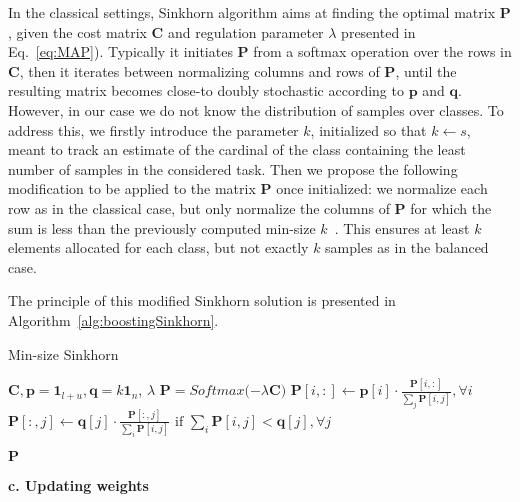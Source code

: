 \documentclass[review]{elsarticle}
\begin{document}
In the classical settings, Sinkhorn algorithm aims at finding the optimal matrix $\mathbf{P}$, given the cost matrix $\mathbf{C}$ and regulation parameter $\lambda$ presented in Eq.~\ref{eq:MAP}). Typically it initiates $\mathbf{P}$ from a softmax operation over the rows in $\mathbf{C}$, then it iterates between normalizing columns and rows of $\mathbf{P}$, until the resulting matrix becomes close-to doubly stochastic according to $\mathbf{p}$ and $\mathbf{q}$. However, in our case we do not know the distribution of samples over classes. To address this, we firstly introduce the parameter $k$, initialized so that $k\leftarrow s$, meant to track an estimate of the cardinal of the class containing the least number of samples in the considered task. Then we propose the following modification to be applied to the matrix $\mathbf{P}$ once initialized: we normalize each row as in the classical case, but only normalize the columns of $\mathbf{P}$ for which the sum is less than the previously computed min-size $k$~\cite{lichtenstein2020tafssl}. This ensures at least $k$ elements allocated for each class, but not exactly $k$ samples as in the balanced case. 

The principle of this modified Sinkhorn solution is presented in Algorithm~\ref{alg:boostingSinkhorn}.

\begin{algorithm}[tb]
   \caption{Min-size Sinkhorn}
   \label{alg:boostingSinkhorn}
\begin{algorithmic}
    {$\mathbf{C}, \mathbf{p}= \mathbf{1}_{l+u}, \mathbf{q}=k\mathbf{1}_{n}$, $\lambda$}
    {$\mathbf{P}= Softmax{(-\lambda\mathbf{C}})$}
   \STATE $\mathbf{P}[i,:] \leftarrow \mathbf{p}[i]\cdot\frac{\mathbf{P}[i,:]}{\sum_j{\mathbf{P}[i,j]}}, \forall i$
   \STATE $\mathbf{P}[:,j] \leftarrow \mathbf{q}[j]\cdot\frac{\mathbf{P}[:,j]}{\sum_i{\mathbf{P}[i,j]}} \text{ if } \sum_i{\mathbf{P}[i,j]} < \mathbf{q}[j], \forall j$
\ENDFOR
   
 $\mathbf{P}$
\end{algorithmic}
\end{algorithm}

\textbf{c. Updating weights}
\end{document}
